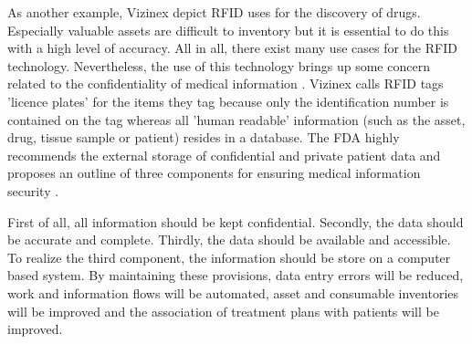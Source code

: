 As another example, Vizinex depict RFID uses for the discovery of drugs. Especially valuable assets are difficult to inventory but it is essential to do this with a high level of accuracy.
All in all, there exist many use cases for the RFID technology. Nevertheless, the use of this technology brings up some concern related to the confidentiality of medical information \cite{vizinex}. Vizinex calls RFID tags 'licence plates' for the items they tag because only the identification number is contained on the tag whereas all 'human readable' information (such as the asset, drug, tissue sample or patient) resides in a database. The FDA highly recommends the external storage of confidential and private patient data and proposes an outline of three components for ensuring medical information security \cite{vizinex}. 

First of all, all information should be kept confidential. Secondly, the data should be accurate and complete. Thirdly, the data should be available and accessible. To realize the third component, the information should be store on a computer based system. 
By maintaining these provisions, data entry errors will be reduced, work and information flows will be automated, asset and consumable inventories will be improved and the association of treatment plans with patients will be improved.